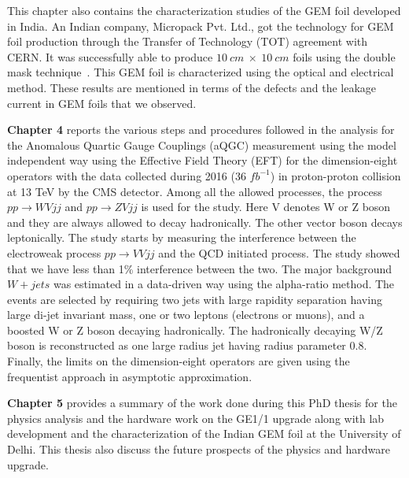 This chapter also contains the characterization studies of the GEM foil developed in India. An Indian company, Micropack Pvt. Ltd., got the technology for GEM foil production through the Transfer of Technology (TOT) agreement with CERN. It was successfully able to produce $10~cm~\times~10~cm$ foils using the double mask technique~\cite{DEOLIVEIRA2009}. This GEM foil is characterized using the optical and electrical method. These results are mentioned in terms of the defects and the leakage current in GEM foils that we observed.


\textbf{Chapter 4} reports the various steps and procedures followed in the analysis for the Anomalous Quartic Gauge Couplings (aQGC) measurement using the model independent way using the Effective Field Theory (EFT) for the dimension-eight operators with the data collected during 2016 (36 $fb^{-1}$) in proton-proton collision at 13 TeV by the CMS detector. Among all the allowed processes, the process $pp \rightarrow WV jj$ and $pp \rightarrow ZV jj$ is used for the study. Here V denotes W or Z boson and they are always allowed to decay hadronically. The other vector boson decays leptonically. The study starts by measuring the interference between the electroweak process $pp \rightarrow VV jj$ and the QCD initiated process. The study showed that we have less than 1\% interference between the two. The major background $W+jets$ was estimated in a data-driven way using the alpha-ratio method. The events are selected by requiring two jets with large rapidity separation having large di-jet invariant mass, one or two leptons (electrons or muons), and a boosted W or Z boson decaying hadronically. The hadronically decaying W/Z boson is reconstructed as one large radius jet having radius parameter 0.8. Finally, the limits on the dimension-eight operators are given using the frequentist approach in asymptotic approximation.


\textbf{Chapter 5} provides a summary of the work done during this PhD thesis for the physics analysis and the hardware work on the GE1/1 upgrade along with lab development and the characterization of the Indian GEM foil at the University of Delhi. This thesis also discuss the future prospects of the physics and hardware upgrade.

